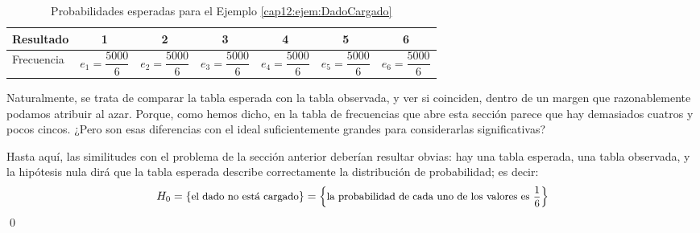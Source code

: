 \begin{ejemplo}
\begin{table}[htb]
{\small
        \begin{center}
        \begin{tabular}{|l|c|c|c|c|c|c|}
          \hline
          Resultado & 1 & 2 & 3 & 4 & 5 & 6 \\
          \hline
          Frecuencia \rule{0cm}{0.6cm}& $e_1=\dfrac{5000}{6}$ & $e_2=\dfrac{5000}{6}$ & $e_3=\dfrac{5000}{6}$ & $e_4=\dfrac{5000}{6}$ & $e_5=\dfrac{5000}{6}$ & $e_6=\dfrac{5000}{6}$\\[2mm]
          \hline
        \end{tabular}
        \end{center}
}
\caption{Probabilidades esperadas para el Ejemplo \ref{cap12:ejem:DadoCargado}}
\label{cap12:tabla:valoresEsperadosEjemploDadoCargado}
\end{table}

Naturalmente, se trata de comparar la tabla esperada con la tabla observada, y ver si coinciden,
dentro de un margen que razonablemente podamos atribuir al azar. Porque, como hemos dicho, en la
tabla de frecuencias que abre esta sección parece que hay demasiados cuatros y pocos cincos. ¿Pero
son esas diferencias con el ideal suficientemente grandes para considerarlas {\sf significativas}?

Hasta aquí, las similitudes con el problema de la sección anterior deberían resultar obvias: hay
una tabla esperada, una tabla observada, y la hipótesis nula dirá que la tabla esperada describe
correctamente la distribución de probabilidad; es decir:
    \[H_0=\left\{\mbox{\small el dado no está cargado}\right\}=\left\{\mbox{\small la probabilidad de cada uno de los valores es $\dfrac{1}{6}$} \right\}\]
\qed
\end{ejemplo}

